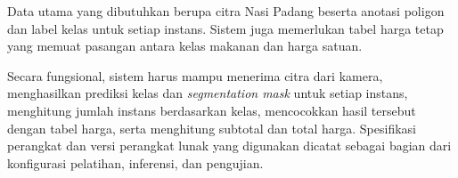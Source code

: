Data utama yang dibutuhkan berupa citra Nasi Padang beserta anotasi poligon dan label kelas untuk setiap instans. Sistem juga memerlukan tabel harga tetap yang memuat pasangan antara kelas makanan dan harga satuan.

Secara fungsional, sistem harus mampu menerima citra dari kamera, menghasilkan prediksi kelas dan \textit{segmentation mask} untuk setiap instans, menghitung jumlah instans berdasarkan kelas, mencocokkan hasil tersebut dengan tabel harga, serta menghitung subtotal dan total harga. Spesifikasi perangkat dan versi perangkat lunak yang digunakan dicatat sebagai bagian dari konfigurasi pelatihan, inferensi, dan pengujian.
